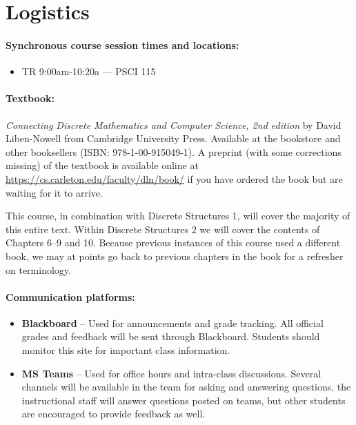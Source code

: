 \documentclass[12pt]{scrartcl}
\begin{document}
\clearpage
\tableofcontents

\section{Logistics}
\paragraph{Synchronous course session times and locations:}
\begin{itemize}
\item TR 9:00am-10:20a --- PSCI 115
\end{itemize}

\paragraph{Textbook:} \textit{Connecting Discrete Mathematics and Computer Science, 2nd edition} by David Liben-Nowell from Cambridge University Press. 
Available at the bookstore and other booksellers (ISBN: 978-1-00-915049-1). 
A preprint (with some corrections missing) of the textbook is available online at \url{https://cs.carleton.edu/faculty/dln/book/} if you have ordered the book but are waiting for it to arrive.

This course, in combination with Discrete Structures 1, will cover the majority of this entire text. Within Discrete Structures 2 we will cover the contents of Chapters 6--9 and 10. 
Because previous instances of this course used a different book, we may at points go back to previous chapters in the book for a refresher on terminology.  

\paragraph{Communication platforms:}
\begin{itemize}
\item \textbf{Blackboard}  -- Used for announcements and grade tracking. All official grades and feedback will be sent through Blackboard. Students should monitor this site for important class information. 
\item \textbf{MS Teams} -- Used for office hours and intra-class discussions. Several channels will be available in the team for asking and answering questions, the instructional staff will answer questions posted on teams, but other students are encouraged to provide feedback as well. 
\end{itemize}
\end{document}
